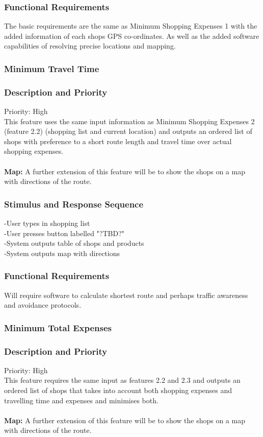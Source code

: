 \documentclass[12pt]{article}
\begin{document}
 \subsubsection*{Functional Requirements}
 The basic requirements are the same as Minimum Shopping Expenses 1 with the added information of each shops GPS co-ordinates. As well as the added software capabilities of resolving precise locations and mapping.
 
 \subsubsection{Minimum Travel Time}
\subsubsection*{Description and Priority}
 Priority: High\\
 This feature uses the same input information as Minimum Shopping Expenses 2 (feature 2.2) (shopping list and current location) and outputs an ordered list of shops with preference to a short route length and travel time over actual shopping expenses.  
\\\\
\textbf{Map:} A further extension of this feature will be to show the shops on a map with directions of the route.
 \subsubsection*{Stimulus and Response Sequence}
-User types in shopping list\\
-User presses button labelled "?TBD?"\\
-System outputs table of shops and products\\
-System outputs map with directions\\ 
\subsubsection*{Functional Requirements}
Will require software to calculate shortest route and perhaps traffic awareness and avoidance  protocols.
 
 \subsubsection{Minimum Total Expenses}
\subsubsection*{Description and Priority}
 Priority: High\\
 This feature requires the same input as features 2.2 and 2.3 and outputs an ordered list of shops that takes into account both shopping expenses and travelling time and expenses and minimises both. 
 \\\\
\textbf{Map:} A further extension of this feature will be to show the shops on a map with directions of the route.
\end{document}
